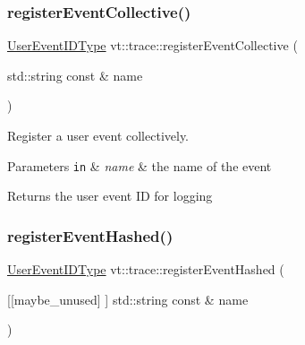 \subsubsection{\texorpdfstring{register\+Event\+Collective()}{registerEventCollective()}\hspace{0.1cm}{\footnotesize\ttfamily [2/2]}}
{\footnotesize\ttfamily \hyperlink{namespacevt_1_1trace_a5908920d051c144c89f17c69ed262350}{User\+Event\+I\+D\+Type} vt\+::trace\+::register\+Event\+Collective (\begin{DoxyParamCaption}\item[{std\+::string const \&}]{name }\end{DoxyParamCaption})}



Register a user event collectively. 


\begin{DoxyParams}[1]{Parameters}
\mbox{\tt in}  & {\em name} & the name of the event\\
\hline
\end{DoxyParams}
\begin{DoxyReturn}{Returns}
the user event ID for logging 
\end{DoxyReturn}
\mbox{\label{namespacevt_1_1trace_aefbbd34012ffc01030aad7e3ed1b05ae}} 
\subsubsection{\texorpdfstring{register\+Event\+Hashed()}{registerEventHashed()}\hspace{0.1cm}{\footnotesize\ttfamily [1/2]}}
{\footnotesize\ttfamily \hyperlink{namespacevt_1_1trace_a5908920d051c144c89f17c69ed262350}{User\+Event\+I\+D\+Type} vt\+::trace\+::register\+Event\+Hashed (\begin{DoxyParamCaption}\item[{\mbox{[}\mbox{[}maybe\+\_\+unused\mbox{]} \mbox{]} std\+::string const \&}]{name }\end{DoxyParamCaption})}

\mbox{\label{namespacevt_1_1trace_a9d0309860e6216c541fe5c3af74a5426}} 
